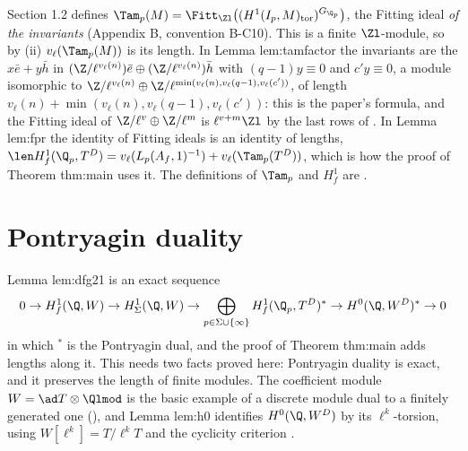 \begin{paperlink}\label{pl:modules:tamagawa}
Section 1.2 defines $\Tam_p(M)=\Fitt_{\Zl}\bigl((H^1(I_p,M)_{\mathrm{tor}})^{G_{\Q_p}}\bigr)$, the Fitting ideal \emph{of the invariants} (Appendix B, convention
B-C10). This is a finite $\Zl$-module, so by
(ii) $v_\ell(\Tam_p(M))$ is its length. In Lemma lem:tamfactor the invariants are the $x\bar e+y\bar h$ in
$(\Z/\ell^{v_\ell(n)})\bar e\oplus(\Z/\ell^{v_\ell(n)})\bar h$ with $(q-1)y\equiv0$ and $c'y\equiv0$, a module isomorphic to $\Z/\ell^{v_\ell(n)}\oplus\Z/\ell^{\min(v_\ell(n),v_\ell(q-1),v_\ell(c'))}$, of
length $v_\ell(n)+\min(v_\ell(n),v_\ell(q-1),v_\ell(c'))$: this is the paper's formula, and the Fitting ideal of $\Z/\ell^v\oplus\Z/\ell^m$ is
$\ell^{v+m}\Zl$ by the last rows of . In Lemma lem:fpr the identity of Fitting ideals is an identity of
lengths, $\len H^1_f(\Q_p,T^D)=v_\ell(L_p(A_f,1)^{-1})+v_\ell(\Tam_p(T^D))$, which is how the proof of Theorem thm:main uses it. The definitions of
$\Tam_p$ and $H^1_f$ are .
\end{paperlink}

\section{Pontryagin duality}\label{sec:modules:pontryagin}

Lemma lem:dfg21 is an exact sequence
\[
0\to H^1_f(\Q,W)\to H^1_\Sigma(\Q,W)\to\bigoplus_{p\in\Sigma\cup\{\infty\}}H^1_f(\Q_p,T^D)^*\to H^0(\Q,W^D)^*\to0
\]
in which ${}^*$ is the Pontryagin dual, and the proof of Theorem thm:main adds lengths along it. This needs two facts proved here: Pontryagin
duality is exact, and it preserves the length of finite modules. The coefficient module $W=\ad T\otimes\Qlmod$ is the basic example of a
discrete module dual to a finitely generated one (), and Lemma lem:h0 identifies $H^0(\Q,W^D)$ by its
$\ell^k$-torsion, using $W[\ell^k]=T/\ell^kT$ and the cyclicity criterion .

